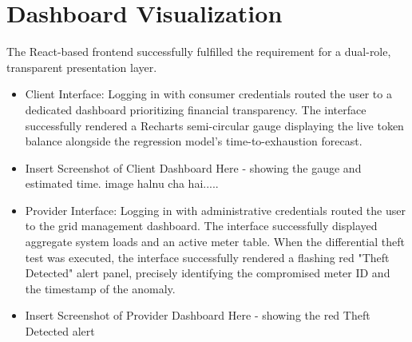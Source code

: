 \section{Dashboard Visualization}
The React-based frontend successfully fulfilled the requirement for a dual-role, transparent presentation layer.
\begin{itemize}
    \item Client Interface: Logging in with consumer credentials routed the user to a dedicated dashboard prioritizing financial transparency. The interface successfully rendered a Recharts semi-circular gauge displaying the live token balance alongside the regression model's time-to-exhaustion forecast.
    \item Insert Screenshot of Client Dashboard Here - showing the gauge and estimated time. image halnu cha hai.....
    \item Provider Interface: Logging in with administrative credentials routed the user to the grid management dashboard. The interface successfully displayed aggregate system loads and an active meter table. When the differential theft test was executed, the interface successfully rendered a flashing red "Theft Detected" alert panel, precisely identifying the compromised meter ID and the timestamp of the anomaly.
    \item Insert Screenshot of Provider Dashboard Here - showing the red Theft Detected alert
\end{itemize}


